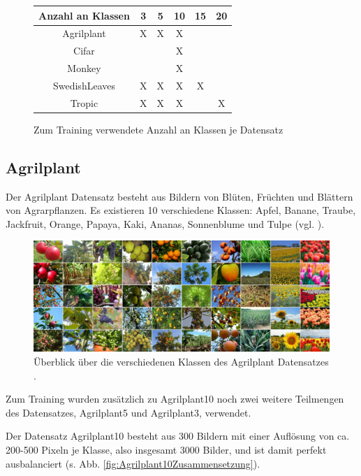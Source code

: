 \begin{figure}[H]
\begin{tabular}{|c|c|c|c|c|c|}
\hline 
Anzahl an Klassen & 3 & 5 & 10 & 15 & 20 \\ 
\hline 
Agrilplant & X & X & X &  &  \\ 
Cifar &  &  & X &  &  \\ 
Monkey &  &  & X &  &  \\ 
SwedishLeaves & X & X & X & X &  \\ 
Tropic & X & X & X & & X \\ 
\hline 
\end{tabular} 
\caption{Zum Training verwendete Anzahl an Klassen je Datensatz}
\label{fig:DatensatzKlassen}
\end{figure}

\subsection{Agrilplant}
Der Agrilplant Datensatz \cite{pawaraWebsiteDatensaetze} besteht aus Bildern von Blüten, Früchten und Blättern von Agrarpflanzen.
Es existieren 10 verschiedene Klassen: Apfel, Banane, Traube, Jackfruit, Orange, Papaya, Kaki, Ananas, Sonnenblume und Tulpe (vgl. \cite{pawaraWebsiteDatensaetze}).
\begin{figure}[H]
\includegraphics[scale=0.2]{img/2_agrilplant-image.jpg}
\caption{Überblick über die verschiedenen Klassen des Agrilplant Datensatzes \cite{pawaraAgrilplant}.}
\label{fig:agrilplantUeberblick}
\end{figure}

Zum Training wurden zusätzlich zu Agrilplant10 noch zwei weitere Teilmengen des Datensatzes, Agrilplant5 und Agrilplant3, verwendet.

Der Datensatz Agrilplant10 besteht aus 300 Bildern mit einer Auflösung von ca. 200-500 Pixeln je Klasse, also insgesamt 3000 Bilder, und ist damit perfekt ausbalanciert (s. Abb. \ref{fig:Agrilplant10Zusammensetzung}).\\


